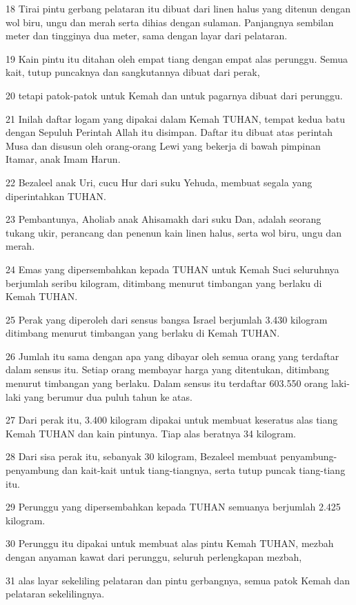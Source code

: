 \par 18 Tirai pintu gerbang pelataran itu dibuat dari linen halus yang ditenun dengan wol biru, ungu dan merah serta dihias dengan sulaman. Panjangnya sembilan meter dan tingginya dua meter, sama dengan layar dari pelataran.
\par 19 Kain pintu itu ditahan oleh empat tiang dengan empat alas perunggu. Semua kait, tutup puncaknya dan sangkutannya dibuat dari perak,
\par 20 tetapi patok-patok untuk Kemah dan untuk pagarnya dibuat dari perunggu.
\par 21 Inilah daftar logam yang dipakai dalam Kemah TUHAN, tempat kedua batu dengan Sepuluh Perintah Allah itu disimpan. Daftar itu dibuat atas perintah Musa dan disusun oleh orang-orang Lewi yang bekerja di bawah pimpinan Itamar, anak Imam Harun.
\par 22 Bezaleel anak Uri, cucu Hur dari suku Yehuda, membuat segala yang diperintahkan TUHAN.
\par 23 Pembantunya, Aholiab anak Ahisamakh dari suku Dan, adalah seorang tukang ukir, perancang dan penenun kain linen halus, serta wol biru, ungu dan merah.
\par 24 Emas yang dipersembahkan kepada TUHAN untuk Kemah Suci seluruhnya berjumlah seribu kilogram, ditimbang menurut timbangan yang berlaku di Kemah TUHAN.
\par 25 Perak yang diperoleh dari sensus bangsa Israel berjumlah 3.430 kilogram ditimbang menurut timbangan yang berlaku di Kemah TUHAN.
\par 26 Jumlah itu sama dengan apa yang dibayar oleh semua orang yang terdaftar dalam sensus itu. Setiap orang membayar harga yang ditentukan, ditimbang menurut timbangan yang berlaku. Dalam sensus itu terdaftar 603.550 orang laki-laki yang berumur dua puluh tahun ke atas.
\par 27 Dari perak itu, 3.400 kilogram dipakai untuk membuat keseratus alas tiang Kemah TUHAN dan kain pintunya. Tiap alas beratnya 34 kilogram.
\par 28 Dari sisa perak itu, sebanyak 30 kilogram, Bezaleel membuat penyambung-penyambung dan kait-kait untuk tiang-tiangnya, serta tutup puncak tiang-tiang itu.
\par 29 Perunggu yang dipersembahkan kepada TUHAN semuanya berjumlah 2.425 kilogram.
\par 30 Perunggu itu dipakai untuk membuat alas pintu Kemah TUHAN, mezbah dengan anyaman kawat dari perunggu, seluruh perlengkapan mezbah,
\par 31 alas layar sekeliling pelataran dan pintu gerbangnya, semua patok Kemah dan pelataran sekelilingnya.

